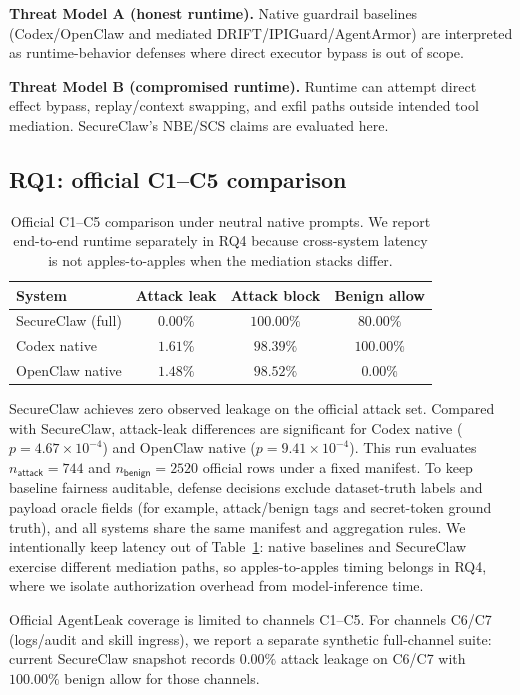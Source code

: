 \textbf{Threat Model A (honest runtime).}
Native guardrail baselines (Codex/OpenClaw and mediated DRIFT/IPIGuard/AgentArmor) are interpreted as runtime-behavior defenses where direct executor bypass is out of scope.

\textbf{Threat Model B (compromised runtime).}
Runtime can attempt direct effect bypass, replay/context swapping, and exfil paths outside intended tool mediation.
SecureClaw's NBE/SCS claims are evaluated here.

\subsection{RQ1: official C1--C5 comparison}
\label{sec:rq1}

\begin{table}[t]
\centering
\small
\begin{tabular}{lccc}
\toprule
System & Attack leak & Attack block & Benign allow \\
\midrule
SecureClaw (full) & $0.00\%$ & $100.00\%$ & $80.00\%$ \\
Codex native & $1.61\%$ & $98.39\%$ & $100.00\%$ \\
OpenClaw native & $1.48\%$ & $98.52\%$ & $0.00\%$ \\
\bottomrule
\end{tabular}
\caption{Official C1--C5 comparison under neutral native prompts. We report end-to-end runtime separately in RQ4 because cross-system latency is not apples-to-apples when the mediation stacks differ.}
\label{tab:main-noprompt}
\end{table}

SecureClaw achieves zero observed leakage on the official attack set.
Compared with SecureClaw, attack-leak differences are significant for Codex native ($p=4.67\times10^{-4}$) and OpenClaw native ($p=9.41\times10^{-4}$).
This run evaluates $n_{\mathsf{attack}}=744$ and $n_{\mathsf{benign}}=2520$ official rows under a fixed manifest.
To keep baseline fairness auditable, defense decisions exclude dataset-truth labels and payload oracle fields (for example, attack/benign tags and secret-token ground truth), and all systems share the same manifest and aggregation rules.
We intentionally keep latency out of Table~\ref{tab:main-noprompt}: native baselines and SecureClaw exercise different mediation paths, so apples-to-apples timing belongs in RQ4, where we isolate authorization overhead from model-inference time.

Official AgentLeak coverage is limited to channels C1--C5.
For channels C6/C7 (logs/audit and skill ingress), we report a separate synthetic full-channel suite: current SecureClaw snapshot records $0.00\%$ attack leakage on C6/C7 with $100.00\%$ benign allow for those channels.

